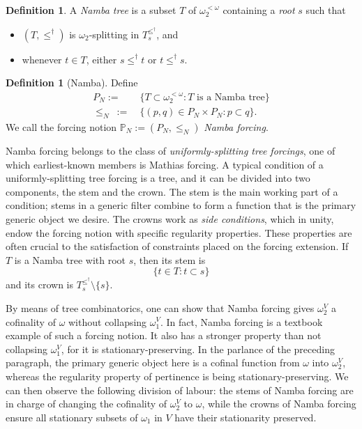 \documentclass[12pt, twoside]{memoir}
\numberwithin{equation}{section}
\theoremstyle{definition}
\newtheorem{defi}[thm]{Definition}
\theoremstyle{remark}
\theoremstyle{definition}
\theoremstyle{definition}
\theoremstyle{definition}
\theoremstyle{remark}
\begin{document}
\begin{defi}
A \emph{Namba tree} is a subset $T$ of $\omega_2^{< \omega}$ containing a \emph{root} $s$ such that
\begin{itemize}
    \item $(T, \leq^{\dagger})$ is $\omega_2$-splitting in $T_s^{\leq^{\dagger}}$, and
    \item whenever $t \in T$, either $s \leq^{\dagger} t$ or $t \leq^{\dagger} s$. 
\end{itemize}
\end{defi}

\begin{defi}[Namba]
Define
\begin{align*}
    P_N := \ & \{T \subset \omega_2^{< \omega} : T \text{ is a Namba tree}\} \\
    \leq_N \ := \ & \{(p, q) \in P_N \times P_N : p \subset q\} \text{.}
\end{align*}
We call the forcing notion $\mathbb{P}_N := (P_N, \leq_N)$ \emph{Namba forcing}.
\end{defi}

Namba forcing belongs to the class of \emph{uniformly-splitting tree forcings}, one of which earliest-known members is Mathias forcing. A typical condition of a uniformly-splitting tree forcing is a tree, and it can be divided into two components, the stem and the crown. The stem is the main working part of a condition; stems in a generic filter combine to form a function that is the primary generic object we desire. The crowns work as \emph{side conditions}, which in unity, endow the forcing notion with specific regularity properties. These properties are often crucial to the satisfaction of constraints placed on the forcing extension. If $T$ is a Namba tree with root $s$, then its stem is $$\{t \in T : t \subset s\}$$ and its crown is $T_s^{\leq^{\dagger}} \setminus \{s\}$.

By means of tree combinatorics, one can show that Namba forcing gives $\omega_2^V$ a cofinality of $\omega$ without collapsing $\omega_1^V$. In fact, Namba forcing is a textbook example of such a forcing notion. It also has a stronger property than not collapsing $\omega_1^V$, for it is stationary-preserving. In the parlance of the preceding paragraph, the primary generic object here is a cofinal function from $\omega$ into $\omega_2^V$, whereas the regularity property of pertinence is being stationary-preserving. We can then observe the following division of labour: the stems of Namba forcing are in charge of changing the cofinality of $\omega_2^V$ to $\omega$, while the crowns of Namba forcing ensure all stationary subsets of $\omega_1$ in $V$ have their stationarity preserved.
\end{document}
